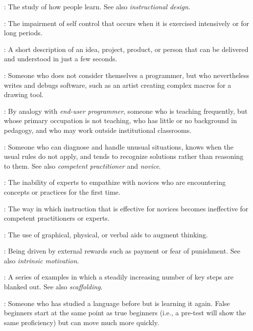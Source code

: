 \begin{description}
: The study of how
people learn. See also \emph{instructional design}.

: The impairment of self control that
occurs when it is exercised intensively or for long periods.

: A short description of an idea,
project, product, or person that can be delivered and understood in just a few
seconds.

: Someone who does not
consider themselves a programmer, but who nevertheless writes and debugs
software, such as an artist creating complex macros for a drawing tool.

: By analogy with \emph{end-user
  programmer}, someone who is teaching frequently, but whose primary occupation
is not teaching, who has little or no background in pedagogy, and who may work
outside institutional classrooms.

: Someone who can diagnose and handle unusual
situations, knows when the usual rules do not apply, and tends to recognize
solutions rather than reasoning to them. See also \emph{competent practitioner}
and \emph{novice}.

: The inability of experts to
empathize with novices who are encountering concepts or practices for the first
time.

: The way in which
instruction that is effective for novices becomes ineffective for competent
practitioners or experts.

: The use of graphical,
physical, or verbal aids to augment thinking.

: Being driven by external
rewards such as payment or fear of punishment. See also \emph{intrinsic
  motivation}.

: A series of examples in which a steadily
increasing number of key steps are blanked out. See also \emph{scaffolding}.

: Someone who has studied a language
before but is learning it again. False beginners start at the same point as true
beginners (i.e., a pre-test will show the same proficiency) but can move much
more quickly.


\end{description}

